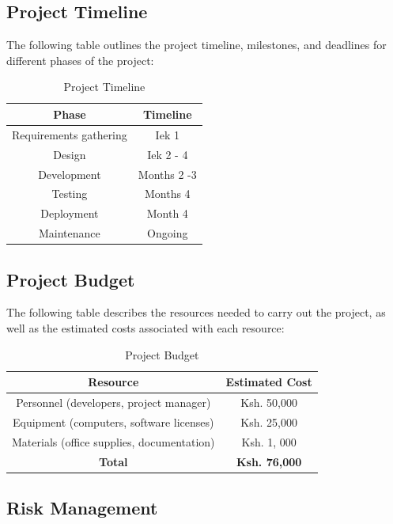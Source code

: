 \documentclass{article}
\begin{document}
\subsection{Project Timeline}

The following table outlines the project timeline, milestones, and deadlines for different phases of the project:

\begin{table}[htbp]
\centering
\caption{Project Timeline}
\begin{tabular}{|c|c|}
\hline
\textbf{Phase} & \textbf{Timeline} \\
\hline
Requirements gathering & Iek 1 \\
Design & Iek 2 - 4 \\
Development & Months 2 -3 \\
Testing & Months 4 \\
Deployment & Month 4 \\
Maintenance & Ongoing \\
\hline
\end{tabular}%
\label{tab:timeline}%
\end{table}%

\subsection{Project Budget}

The following table describes the resources needed to carry out the project, as well as the estimated costs associated with each resource:

\begin{table}[htbp]
\centering
\caption{Project Budget}
\begin{tabular}{|c|c|}
\hline
\textbf{Resource} & \textbf{Estimated Cost} \\
\hline
Personnel (developers, project manager) & Ksh. 50,000 \\
Equipment (computers, software licenses) & Ksh. 25,000 \\
Materials (office supplies, documentation) & Ksh. 1, 000 \\
\hline
\textbf{Total} & \textbf{Ksh. 76,000} \\
\hline
\end{tabular}%
\label{tab:budget}%
\end{table}%

\subsection{Risk Management}
\end{document}
